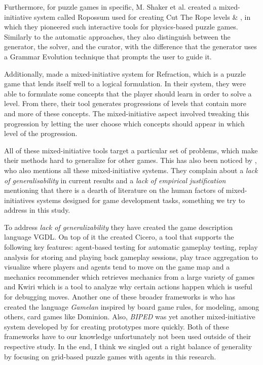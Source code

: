 Furthermore, for puzzle games in specific, M. Shaker et al. created a mixed-initiative system called Ropossum used for creating Cut The Rope levels \cite{Shaker2013} \& \cite{Shaker2013Ropossum}, in which they pioneered such interactive tools for physics-based puzzle games. Similarly to the automatic approaches, they also distinguish between the generator, the solver, and the curator, with the difference that the generator uses a Grammar Evolution technique that prompts the user to guide it.

Additionally, \cite{Butler2013} made a mixed-initiative system for Refraction, which is a puzzle game that lends itself well to a logical formulation. In their system, they were able to formulate some concepts that the player should learn in order to solve a level. From there, their tool generates progressions of levels that contain more and more of these concepts. The mixed-initiative aspect involved tweaking this progression by letting the user choose which concepts should appear in which level of the progression.

All of these mixed-initiative tools target a particular set of problems, which make their methods hard to generalize for other games.
This has also been noticed by \cite{MacHado2018}, who also mentions all these mixed-initiative systems. They complain about a \textit{lack of generalisability} in current results and a \textit{lack of empirical justification} mentioning that there is a dearth of literature on the human factors of mixed-initiatives systems designed for game development tasks, something we try to address in this study.

To address \textit{lack of generalizability} they have created the game description language VGDL. 
On top of it the created Cicero, a tool that supports the following key features: agent-based testing for automatic gameplay testing, replay analysis for storing and playing back gameplay sessions, play trace aggregation to visualize where players and agents tend to move on the game map and a mechanics recommender which retrieves mechanics from a large variety of games and Kwiri which is a tool to analyze why certain actions happen which is useful for debugging moves. 
Another one of these broader frameworks is \cite{Osborn2011} who has created the language \textit{Gamelan} inspired by board game rules, for modeling, among others, card games like Dominion. Also, \textit{BIPED} was yet another mixed-initiative system developed by \cite{Smith2008} for creating prototypes more quickly. Both of these frameworks have to our knowledge unfortunately not been used outside of their respective study.
In the end, I think we singled out a right balance of generality by focusing on grid-based puzzle games with agents in this research.


